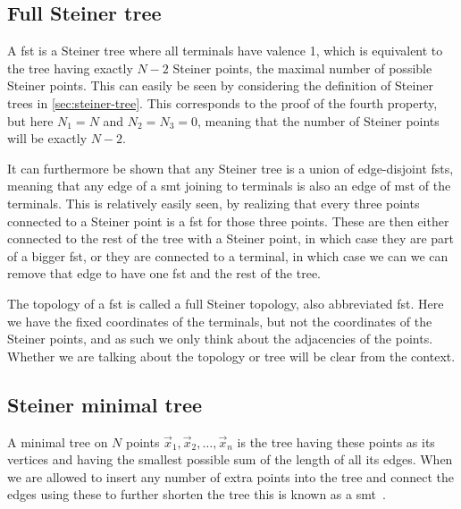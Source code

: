 \subsection{Full Steiner tree}
\label{sec:full-steiner-tree}

A \gls{fst} is a Steiner tree where all terminals have valence 1, which is
equivalent to the tree having exactly $N-2$ Steiner points, the maximal number
of possible Steiner points.  This can easily be seen by considering the
definition of Steiner trees in \cref{sec:steiner-tree}.  This corresponds to the
proof of the fourth property, but here $N_1 = N$ and $N_2 = N_3 = 0$, meaning
that the number of Steiner points will be exactly $N-2$.

It can furthermore be shown that any Steiner tree is a union of edge-disjoint
\glspl{fst}, meaning that any edge of a \gls{smt} joining to terminals is
also an edge of \gls{mst} of the terminals.  This is relatively easily seen,
by realizing that every three points connected to a Steiner point is a \gls{fst}
for those three points.  These are then either connected to the rest of the tree
with a Steiner point, in which case they are part of a bigger \gls{fst}, or they
are connected to a terminal, in which case we can we can remove that edge
to have one \gls{fst} and the rest of the tree.

The topology of a \gls{fst} is called a full Steiner topology, also abbreviated
\gls{fst}.  Here we have the fixed coordinates of the terminals, but not the
coordinates of the Steiner points, and as such we only think about the
adjacencies of the points.  Whether we are talking about the topology or tree
will be clear from the context.

\subsection{Steiner minimal tree}
\label{sec:steiner-minimal-tree}

A minimal tree on $N$ points $\vec{x}_{1},\vec{x}_{2},\ldots,\vec{x}_{n}$ is the
tree having these points as its vertices and having the smallest possible sum of
the length of all its edges.  When we are allowed to insert any number of extra
points into the tree and connect the edges using these to further shorten the
tree this is known as a \gls{smt}~\cite{Gilbert1968}.


